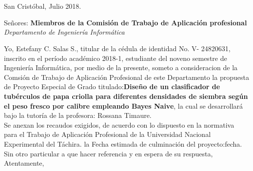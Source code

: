 \chapter*{}
\pagestyle{empty}
\thispagestyle{empty}
\begin{flushright}
San Crist\'obal, Julio 2018.
\end{flushright}


\begin{flushleft}
Se\~nores:
\textbf{Miembros de la Comisi\'on de Trabajo de Aplicaci\'on profesional}
\textit{Departamento de Ingenier\'ia Inform\'atica}
\end{flushleft}



	Yo, Estefany C. Salas S., titular de la c\'edula de identidad No. V- 24820631, inscrito en el per\'iodo acad\'emico 2018-1, estudiante del noveno semestre de Ingenier\'ia Inform\'atica, por medio de la presente, someto a consideracion de la Comsi\'on de Trabajo de Aplicaci\'on Profesional de este Departamento la propuesta de Proyecto Especial de Grado titulado:\textbf{Diseño de un clasificador de tubérculos de papa criolla para diferentes densidades de siembra según el peso fresco por calibre empleando Bayes Naive}, la cual se desarrollar\'a bajo la tutor\'ia de la profesora: Rossana Timaure.\\
	
	
	Se anexan los recaudos exigidos, de acuerdo con lo dispuesto en la normativa para el Trabajo de Aplicaci\'on Profesional de la Universidad Nacional Experimental del T\'achira. la Fecha estimada de culminaci\'on del proyecto:fecha.\\
	
	
	Sin otro particular a que hacer referencia y en espera de su respuesta,\\
	
	
	Atentamente,\\
	
	
	\begin{center}
	
	
	
	\end{center}
	 